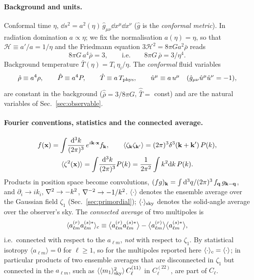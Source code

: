 \paragraph{Background and units.}
Conformal time $\eta$, $\dd s^2=a^2(\eta)\,\hat g_{\mu\nu}\dd x^\mu\dd x^\nu$ ($\hat g$ is the \emph{conformal metric}).  In radiation
domination $a\propto\eta$; we fix the normalisation $a(\eta)=\eta$, so that $\mathcal H\equiv a'/a=1/\eta$
and the Friedmann equation $3\mathcal H^2=8\pi G a^2\bar\rho$ reads
\begin{equation}
8\pi G\,a^4\bar\rho=3,\qquad\text{i.e.}\qquad 8\pi G\,\bar\rho=3/\eta^4 .
\label{eq:friedmann}
\end{equation}
Background temperature $\bar T(\eta)=T_i\,\eta_i/\eta$.  The \emph{conformal} fluid variables
\begin{equation}
\hat\rho\equiv a^4\rho,\qquad \hat P\equiv a^4P,\qquad \hat T\equiv a\,T_{\rm phys},\qquad
\hat u^\mu\equiv a\,u^\mu\quad(\hat g_{\mu\nu}\hat u^\mu\hat u^\nu=-1),
\label{eq:hatvars}
\end{equation}
are constant in the background ($\hat{\bar\rho}=3/8\pi G$, $\hat{\bar T}=$ const) and are the natural
variables of Sec.~\ref{sec:observable}.

\paragraph{Fourier conventions, statistics and the connected average.}
\begin{gather}
f(\mathbf x)=\int\!\frac{\mathrm d^3k}{(2\pi)^3}\,e^{i\mathbf k\cdot\mathbf x}f_{\mathbf k},\qquad
\langle\zeta_{\mathbf k}\zeta_{\mathbf k'}\rangle=(2\pi)^3\delta^3(\mathbf k+\mathbf k')\,P(k),\nonumber\\
\langle\zeta^2(\mathbf x)\rangle=\int\!\frac{\mathrm d^3k}{(2\pi)^3}P(k)=\frac1{2\pi^2}\int k^2\mathrm d k\,P(k).
\label{eq:fourier}
\end{gather}
Products in position space become convolutions, $ (fg)_{\mathbf k}=\int\mathrm d^3q/(2\pi)^3\,f_{\mathbf q}\,g_{\mathbf k-\mathbf q}$,
and $\partial_i\to ik_i$, $\nabla^{2}\to-k^2$, $\nabla^{-2}\to-1/k^2$.  $\langle\cdot\rangle$ denotes the ensemble
average over the Gaussian field $\zeta_1$ (Sec.~\ref{sec:primordial}); $\langle \cdot\rangle_{\rm sky}$ denotes the
solid-angle average over the observer's sky.  The \emph{connected average} of two multipoles is
\begin{equation}
\langle a^{(r)}_{\ell m}a^{(s)*}_{\ell m}\rangle_c\equiv\big\langle a^{(r)}_{\ell m}a^{(s)*}_{\ell m}\big\rangle-\big\langle a^{(r)}_{\ell m}\big\rangle\big\langle a^{(s)*}_{\ell m}\big\rangle ,
\label{eq:conn}
\end{equation}
i.e.\ connected with respect to the $a_{\ell m}$, \emph{not} with respect to $\zeta_1$.  By statistical isotropy
$\langle a_{\ell m}\rangle=0$ for $\ell\ge1$, so for the multipoles reported here $\langle \cdot\rangle_c=\langle\cdot\rangle$; in particular products
of two ensemble averages that are disconnected in $\zeta_1$ but connected in the $a_{\ell m}$, such as
$\langle\langle m_1\rangle_{\rm sky}^2\rangle\,C^{(11)}_\ell$ in $C^{(22)}_\ell$, are part of $C_\ell$.

